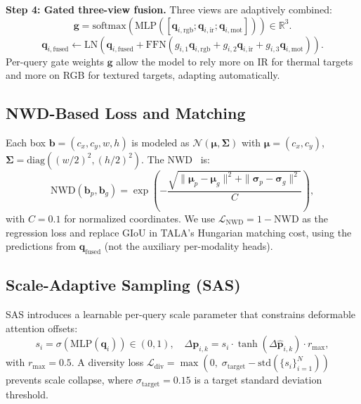 \documentclass[10pt,twocolumn,letterpaper]{article}
\begin{document}
\textbf{Step 4: Gated three-view fusion.}
Three views are adaptively combined:
\begin{equation}
\mathbf{g} = \text{softmax}\!\left(\text{MLP}([\mathbf{q}_{i,\text{rgb}};\mathbf{q}_{i,\text{ir}};\mathbf{q}_{i,\text{mot}}])\right) \in \mathbb{R}^3.
\end{equation}
\begin{equation}
\mathbf{q}_{i,\text{fused}} \leftarrow \text{LN}\!\left(\mathbf{q}_{i,\text{fused}} + \text{FFN}(g_{i,1}\mathbf{q}_{i,\text{rgb}} + g_{i,2}\mathbf{q}_{i,\text{ir}} + g_{i,3}\mathbf{q}_{i,\text{mot}})\right).
\end{equation}
Per-query gate weights $\mathbf{g}$ allow the model to rely more on IR for thermal targets and more on RGB for textured targets, adapting automatically.

\subsection{NWD-Based Loss and Matching}
\label{sec:nwd}

Each box $\mathbf{b}=(c_x,c_y,w,h)$ is modeled as $\mathcal{N}(\boldsymbol{\mu},\boldsymbol{\Sigma})$ with $\boldsymbol{\mu}=(c_x,c_y)$, $\boldsymbol{\Sigma}=\text{diag}((w/2)^2,(h/2)^2)$.
The NWD~\cite{nwd_wang2022} is:
\begin{equation}
\text{NWD}(\mathbf{b}_p,\mathbf{b}_g)=\exp\!\left(-\frac{\sqrt{\|\boldsymbol{\mu}_p-\boldsymbol{\mu}_g\|^2+\|\boldsymbol{\sigma}_p-\boldsymbol{\sigma}_g\|^2}}{C}\right),
\end{equation}
with $C=0.1$ for normalized coordinates.
We use $\mathcal{L}_\text{NWD}=1-\text{NWD}$ as the regression loss and replace GIoU in TALA's Hungarian matching cost, using the predictions from $\mathbf{q}_\text{fused}$ (not the auxiliary per-modality heads).

\subsection{Scale-Adaptive Sampling (SAS)}
\label{sec:sas}

SAS introduces a learnable per-query scale parameter that constrains deformable attention offsets:
\begin{equation}
s_i = \sigma(\text{MLP}(\mathbf{q}_i)) \in (0,1),\quad \Delta\mathbf{p}_{i,k} = s_i \cdot \tanh(\Delta\hat{\mathbf{p}}_{i,k}) \cdot r_\text{max},
\end{equation}
with $r_\text{max}=0.5$.
A diversity loss $\mathcal{L}_\text{div}=\max(0,\;\sigma_\text{target} - \text{std}(\{s_i\}_{i=1}^N))$ prevents scale collapse, where $\sigma_\text{target}=0.15$ is a target standard deviation threshold.
\end{document}
